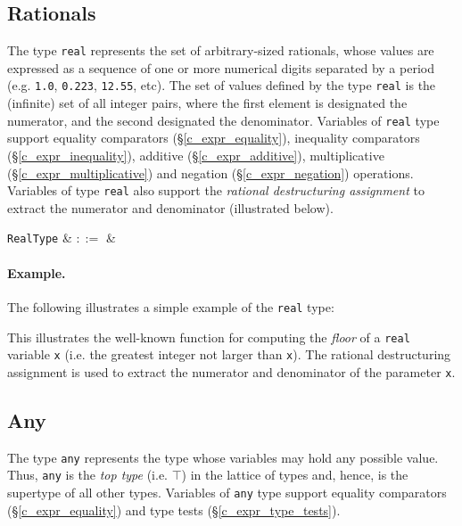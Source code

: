 \subsection{Rationals}
\label{c_types_real}

The type \lstinline{real} represents the set of arbitrary-sized rationals, whose values are expressed as a sequence of one or more numerical digits separated by a period (e.g. \lstinline{1.0}, \lstinline{0.223}, \lstinline{12.55}, etc).  The set of values defined by the type \lstinline{real} is the (infinite) set of all integer pairs, where the first element is designated the numerator, and the second designated the denominator.  Variables of \lstinline{real} type support equality comparators (\S\ref{c_expr_equality}), inequality comparators (\S\ref{c_expr_inequality}), additive (\S\ref{c_expr_additive}), multiplicative (\S\ref{c_expr_multiplicative}) and negation (\S\ref{c_expr_negation}) operations.  Variables of type \lstinline{real} also support the {\em rational destructuring assignment} to extract the numerator and denominator (illustrated below).

\begin{syntax}
  \verb+RealType+ & $::=$ &  \\
\end{syntax}

\paragraph{Example.} The following illustrates a simple example of the \lstinline{real} type:



This illustrates the well-known function for computing the {\em floor} of a \lstinline{real} variable \lstinline{x} (i.e. the greatest integer not larger than \lstinline{x}).  The rational destructuring assignment is used to extract the numerator and denominator of the parameter \lstinline{x}.


\subsection{Any}
\label{c_types_any}

The type \lstinline{any} represents the type whose variables may hold any possible value.  Thus, \lstinline{any} is the {\em top type} (i.e. $\top$) in the lattice of types and, hence, is the supertype of all other types.  Variables of \lstinline{any} type support equality comparators (\S\ref{c_expr_equality}) and type tests (\S\ref{c_expr_type_tests}).

